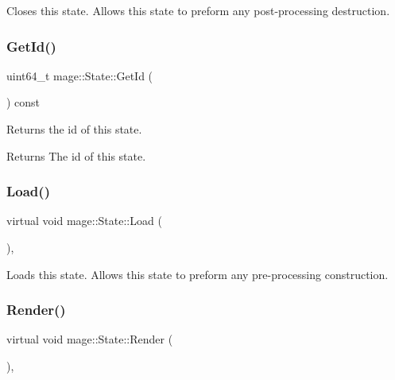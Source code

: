 Closes this state. Allows this state to preform any post-\/processing destruction. \hypertarget{classmage_1_1_state_a07c383a809204ba12a2bbfb22d2977d5}{}\label{classmage_1_1_state_a07c383a809204ba12a2bbfb22d2977d5} 
\subsubsection{\texorpdfstring{Get\+Id()}{GetId()}}
{\footnotesize\ttfamily uint64\+\_\+t mage\+::\+State\+::\+Get\+Id (\begin{DoxyParamCaption}{ }\end{DoxyParamCaption}) const}

Returns the id of this state.

\begin{DoxyReturn}{Returns}
The id of this state. 
\end{DoxyReturn}
\hypertarget{classmage_1_1_state_aa88ace504c82ad372e5e599746f3ebda}{}\label{classmage_1_1_state_aa88ace504c82ad372e5e599746f3ebda} 
\subsubsection{\texorpdfstring{Load()}{Load()}}
{\footnotesize\ttfamily virtual void mage\+::\+State\+::\+Load (\begin{DoxyParamCaption}{ }\end{DoxyParamCaption})\hspace{0.3cm}{\ttfamily [protected]}, {\ttfamily [virtual]}}

Loads this state. Allows this state to preform any pre-\/processing construction. \hypertarget{classmage_1_1_state_a6e3b3f55bfd5be86a02783a2f76c9709}{}\label{classmage_1_1_state_a6e3b3f55bfd5be86a02783a2f76c9709} 
\subsubsection{\texorpdfstring{Render()}{Render()}}
{\footnotesize\ttfamily virtual void mage\+::\+State\+::\+Render (\begin{DoxyParamCaption}{ }\end{DoxyParamCaption})\hspace{0.3cm}{\ttfamily [protected]}, {\ttfamily [virtual]}}

